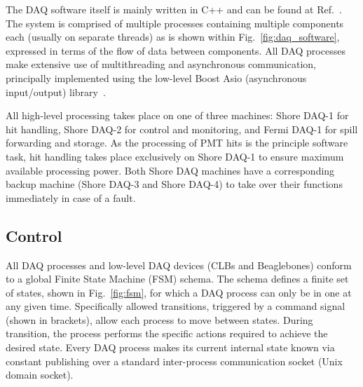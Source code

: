 The DAQ software itself is mainly written in C++ and can be found at Ref.~\cite{chipsdaq2020}. The
system is comprised of multiple processes containing multiple components each (usually on separate
threads) as is shown within Fig.~\ref{fig:daq_software}, expressed in terms of the flow of data
between components. All DAQ processes make extensive use of multithreading and asynchronous
communication, principally implemented using the low-level Boost Asio (asynchronous input/output)
library~\cite{boost2020}. 

All high-level processing takes place on one of three machines: Shore DAQ-1 for hit handling,
Shore DAQ-2 for control and monitoring, and Fermi DAQ-1 for \numi spill forwarding and storage. As
the processing of PMT hits is the principle software task, hit handling takes place exclusively on
Shore DAQ-1 to ensure maximum available processing power. Both Shore DAQ machines have a
corresponding backup machine (Shore DAQ-3 and Shore DAQ-4) to take over their functions
immediately in case of a fault.

\subsection{Control} %
\label{sec:daq_soft_control} %

All DAQ processes and low-level DAQ devices (CLBs and Beaglebones) conform to a global Finite
State Machine (FSM) schema. The schema defines a finite set of states, shown in
Fig.~\ref{fig:fsm}, for which a DAQ process can only be in one at any given time. Specifically
allowed transitions, triggered by a command signal (shown in brackets), allow each process to move
between states. During transition, the process performs the specific actions required to achieve
the desired state. Every DAQ process makes its current internal state known via constant
publishing over a standard inter-process communication socket (Unix domain socket).

